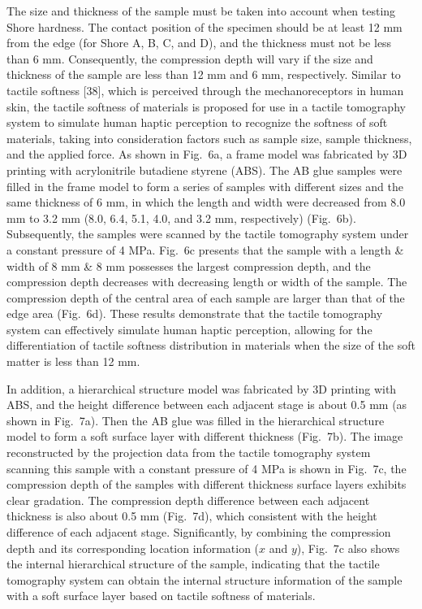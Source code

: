 \documentclass[11pt]{article}
\begin{document}
The size and thickness of the sample must be taken into account when
testing Shore hardness. The contact position of the specimen should
be at least 12 mm from the edge (for Shore A, B, C, and D), and the
thickness must not be less than 6 mm. Consequently, the compression
depth will vary if the size and thickness of the sample are less
than 12 mm and 6 mm, respectively. Similar to tactile softness [38],
which is perceived through the mechanoreceptors in human skin, the
tactile softness of materials is proposed for use in a tactile
tomography system to simulate human haptic perception to recognize
the softness of soft materials, taking into consideration factors
such as sample size, sample thickness, and the applied force. As
shown in Fig.~6a, a frame model was fabricated by 3D printing with
acrylonitrile butadiene styrene (ABS). The AB glue samples were
filled in the frame model to form a series of samples with different
sizes and the same thickness of 6 mm, in which the length and width
were decreased from 8.0 mm to 3.2 mm (8.0, 6.4, 5.1, 4.0, and 3.2
mm, respectively) (Fig.~6b). Subsequently, the samples were scanned
by the tactile tomography system under a constant pressure of 4 MPa.
Fig.~6c presents that the sample with a length \& width of 8 mm \&
8 mm possesses the largest compression depth, and the compression
depth decreases with decreasing length or width of the sample. The
compression depth of the central area of each sample are larger than
that of the edge area (Fig.~6d). These results demonstrate that the
tactile tomography system can effectively simulate human haptic
perception, allowing for the differentiation of tactile softness
distribution in materials when the size of the soft matter is less
than 12 mm.

In addition, a hierarchical structure model was fabricated by 3D
printing with ABS, and the height difference between each adjacent
stage is about 0.5 mm (as shown in Fig.~7a). Then the AB glue was
filled in the hierarchical structure model to form a soft surface
layer with different thickness (Fig.~7b). The image reconstructed by
the projection data from the tactile tomography system scanning this
sample with a constant pressure of 4 MPa is shown in Fig.~7c, the
compression depth of the samples with different thickness surface
layers exhibits clear gradation. The compression depth difference
between each adjacent thickness is also about 0.5 mm (Fig.~7d),
which consistent with the height difference of each adjacent stage.
Significantly, by combining the compression depth and its
corresponding location information ($x$ and $y$), Fig.~7c also
shows the internal hierarchical structure of the sample, indicating
that the tactile tomography system can obtain the internal structure
information of the sample with a soft surface layer based on tactile
softness of materials.
\end{document}
